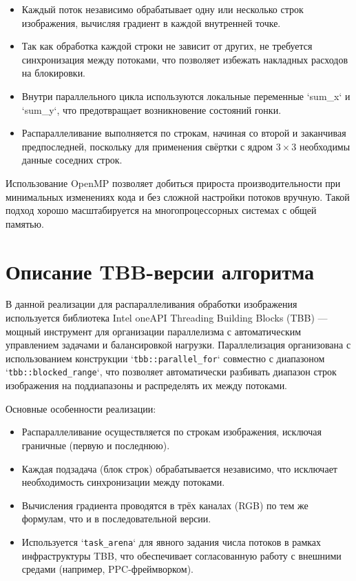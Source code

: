 \documentclass[14pt,a4paper]{extarticle}
\begin{document}
\begin{itemize}
    \item Каждый поток независимо обрабатывает одну или несколько строк изображения, вычисляя градиент в каждой внутренней точке.
    \item Так как обработка каждой строки не зависит от других, не требуется синхронизация между потоками, что позволяет избежать накладных расходов на блокировки.
    \item Внутри параллельного цикла используются локальные переменные `sum\_x` и `sum\_y`, что предотвращает возникновение состояний гонки.
    \item Распараллеливание выполняется по строкам, начиная со второй и заканчивая предпоследней, поскольку для применения свёртки с ядром $3 \times 3$ необходимы данные соседних строк.
\end{itemize}

Использование OpenMP позволяет добиться прироста производительности при минимальных изменениях кода и без сложной настройки потоков вручную. 
Такой подход хорошо масштабируется на многопроцессорных системах с общей памятью.

\section{Описание TBB-версии алгоритма}

В данной реализации для распараллеливания обработки изображения используется библиотека Intel oneAPI Threading Building Blocks (TBB) — 
мощный инструмент для организации параллелизма с автоматическим управлением задачами и балансировкой нагрузки.
Параллелизация организована с использованием конструкции `\texttt{tbb::parallel\_for}` совместно с диапазоном `\texttt{tbb::blocked\_range}`, что позволяет автоматически разбивать диапазон строк изображения на поддиапазоны и распределять их между потоками.

Основные особенности реализации:

\begin{itemize}
    \item Распараллеливание осуществляется по строкам изображения, исключая граничные (первую и последнюю).
    \item Каждая подзадача (блок строк) обрабатывается независимо, что исключает необходимость синхронизации между потоками.
    \item Вычисления градиента проводятся в трёх каналах (RGB) по тем же формулам, что и в последовательной версии.
    \item Используется `\texttt{task\_arena}` для явного задания числа потоков в рамках инфраструктуры TBB, что обеспечивает согласованную работу с внешними средами (например, PPC-фреймворком).
\end{itemize}
\end{document}
